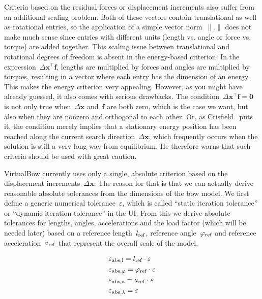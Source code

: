 Criteria based on the residual forces or displacement increments also suffer from an additional scaling problem.
Both of these vectors contain translational as well as rotational entries, so the application of a simple vector norm~$\lVert.\rVert$ does not make much sense since entries with different units (length vs. angle or force vs. torque) are added together.
This scaling issue between translational and rotational degrees of freedom is absent in the energy-based criterion:
In the expression~$\Delta\boldsymbol{x}^\intercal\boldsymbol{f}$, lengths are multiplied by forces and angles are multiplied by torques, resulting in a vector where each entry has the dimension of an energy.
This makes the energy criterion very appealing.
However, as you might have already guessed, it also comes with serious drawbacks.
The condition~$\Delta\boldsymbol{x}^\intercal\boldsymbol{f} = \boldsymbol{0}$ is not only true when~$\Delta\boldsymbol{x}$ and~$\boldsymbol{f}$ are both zero, which is the case we want, but also when they are nonzero and orthogonal to each other.
Or, as Crisfield~\cite{bib:chrisfield1991} puts it, the condition merely implies that a stationary energy position has been reached along the current search direction~$\Delta\boldsymbol{x}$, which frequently occurs when the solution is still a very long way from equilibrium.
He therefore warns that such criteria should be used with great caution.

VirtualBow currently uses only a single, absolute criterion based on the displacement increments~$\Delta\boldsymbol{x}$.
The reason for that is that we can actually derive reasonable absolute tolerances from the dimensions of the bow model.
We first define a generic numerical tolerance~$\varepsilon$, which is called ``static iteration tolerance'' or ``dynamic iteration tolerance'' in the UI.
From this we derive absolute tolerances for lengths, angles, accelerations and the load factor (which will be needed later) based on a reference length~$l_{\rm{ref}}$, reference angle~$\varphi_{\rm{ref}}$ and reference acceleration~$a_{\rm{ref}}$ that represent the overall scale of the model,

\begin{align}
&\varepsilon_{\rm{abs},l} = l_{\rm{ref}}\cdot\varepsilon \\
&\varepsilon_{\rm{abs},\varphi} = \varphi_{\rm{ref}}\cdot\varepsilon \\
&\varepsilon_{\rm{abs},a} = a_{\rm{ref}}\cdot\varepsilon \\
&\varepsilon_{\rm{abs},\lambda} = \varepsilon
\end{align}
 
